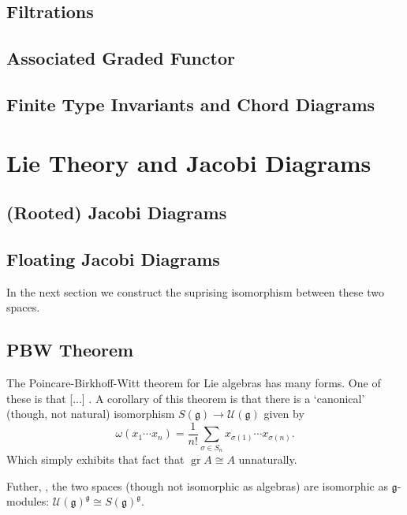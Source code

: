 \documentclass[12pt]{report}
\theoremstyle{regular}
\newcommand{\scaffold}[1]{
\begin{mdframed}[style=scaffold]
        {\color{teal}#1}
\end{mdframed}
}
\begin{document}
        \section{Filtrations}
        \section{Associated Graded Functor}

        \section{Finite Type Invariants and Chord Diagrams}

        \chapter{Lie Theory and Jacobi Diagrams}
        \label{ch:lie-theory-and-jocobi-diagrams}

        \section{(Rooted) Jacobi Diagrams}

        \section{Floating Jacobi Diagrams}

        \scaffold{In the next section we construct the suprising isomorphism between these two spaces.}

        \section{PBW Theorem}

        \scaffold{The Poincare-Birkhoff-Witt theorem for Lie algebras has many forms. One of these is that [...] . A corollary of this theorem \cite{enveloping-algebras} is that there is a `canonical' (though, not natural) isomorphism \(S(\mathfrak{g}) \to \mathcal{U}(\mathfrak{g})\) given by \[\omega(x_{1} \cdots x_{n}) = \frac{1}{n!} \sum_{\sigma \in S_{n}} x_{\sigma(1)} \cdots x_{\sigma(n)}.\] Which simply exhibits that fact that \(\operatorname{gr} A \cong A\) unnaturally.}

        \scaffold{Futher, \cite{enveloping-algebras}, the two spaces (though not isomorphic as algebras) are isomorphic as \(\mathfrak{g}\)-modules: \(\mathcal{U}(\mathfrak{g})^{\mathfrak{g}} \cong S(\mathfrak{g})^{\mathfrak{g}}\).}
\end{document}

